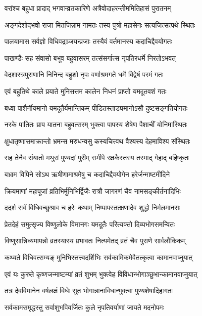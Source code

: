 \twolineshloka
{वरांश्च बहुधा प्रादाद् भगवान्व्रतकारिणे}
{अत्रैवोदाहरन्तीममितिहासं पुरातनम्} %

\twolineshloka
{अङ्गदेशोद्भवो राजा मितजिन्नाम नामतः}
{तस्य पुत्रो महासेनः सत्यजित्सत्पथे स्थितः} %

\twolineshloka
{पालयामास सर्वज्ञो विधिवद्रञ्जयन्प्रजाः}
{तस्यैवं वर्तमानस्य कदाचिद्दैवयोगतः} %

\twolineshloka
{पाखण्डैः सह संवासो बभूव बहुवासरम्}
{तत्संसर्गात्स नृपतिरधर्मे निरतोऽभवत्} %

\twolineshloka
{वेदशास्त्रपुराणानि निनिन्द बहुशो नृपः}
{वर्णाश्रमगते धर्मे विद्वेषं परमं गतः} %

\twolineshloka
{एवं बहुतिथे काले प्रयाते मुनिसत्तम}
{कालेन निधनं प्राप्तो यमदूतवशं गतः} %

\twolineshloka
{बध्वा पाशैर्नीयमानो यमदूतैर्यमान्तिकम्}
{पीडितस्ताड्यमानोऽसौ दुष्टसङ्गतियोगतः} %

\twolineshloka
{नरके पातितः प्राप यातना बहुवत्सरम्}
{भुक्त्वा पापस्य शेषेण पैशाचीं योनिमास्थितः} %

\twolineshloka
{क्षुधातृष्णासमाक्रान्तो भ्रमन्स मरुधन्वसु}
{कस्यचित्त्वथ वैश्यस्य देहमाविश्य संस्थितः} %

\twolineshloka
{सह तेनैव संयातो मथुरां पुण्यदां पुरीम्}
{समीपे रक्षकैस्तस्य तस्माद् गेहाद् बहिष्कृतः} %

\twolineshloka
{बभ्राम विपिने सोऽथ ऋषीणामाश्रमेषु च}
{कदाचिद्दैवयोगेन हरेर्जन्माष्टमीदिने} %

\twolineshloka
{क्रियमाणां महापूजां व्रतिभिर्मुनिभिर्द्विजैः}
{रात्रौ जागरणं चैव नामसङ्कीर्तनादिभिः} %

\twolineshloka
{ददर्श सर्वं विधिवच्छुश्राव च हरेः कथाम्}
{निष्पापस्तत्क्षणादेव शुद्धो निर्मलमानसः} %

\twolineshloka
{प्रेतदेहं समुत्सृज्य विष्णुलोके विमानगः}
{यमदूतैः परित्यक्तो दिव्यभोगसमन्वितः} %

\twolineshloka
{विष्णुसान्निध्यमापन्नो व्रतस्यास्य प्रभावतः}
{नित्यमेतद् व्रतं चैव पुराणे सार्वलौकिकम्} %

\twolineshloka
{कथ्यते विधिवत्सम्यङ् मुनिभिस्तत्त्वदर्शिभिः}
{सर्वकामिकमेवैतत्कृत्वा कामानवाप्नुयात्} %

\twolineshloka
{एवं यः कुरुते कृष्णजन्माष्टम्यां व्रतं शुभम्}
{भुक्त्वेह विविधान्भोगाञ्छुभान्कामानवाप्नुयात्} %

\twolineshloka
{तत्र देवविमानेन वर्षलक्षं विधेः सुत}
{भोगान्नानाविधान्भुक्त्वा पुण्यशेषादिहागतः} %

\twolineshloka
{सर्वकामसमृद्धस्तु सर्वाशुभविवर्जितः}
{कुले नृपतिवर्याणां जायते मदनोपमः} %

